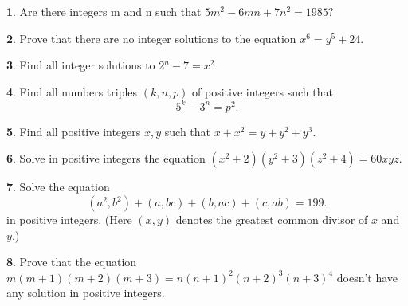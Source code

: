 \documentclass{article}
\theoremstyle{definition}
\newtheorem{p}{}
\begin{document}
	
	
	
	
	
	\begin{p}
		Are there integers m and n such that $5m^{2}-6mn+7n^{2}=1985$?
	\end{p}
	
	
	
	
	
	
	\begin{p}
		Prove that there are no integer solutions to the equation $x^{6}= y^{5}+24$.
	\end{p}
	
	
	
	
	
	
	\begin{p}
		Find all integer solutions to $2^n-7=x^2$
	\end{p}
	
	
	
	
	
	
	\begin{p}
		Find all numbers triples $(k,n,p)$ of positive integers such that
		\[5^{k}-3^{n}=p^{2}.\]
	\end{p}
	
	
	
	
	
	
	\begin{p}
		Find all positive integers $x,y$ such that $x+x^{2}=y+y^{2}+y^{3}$.
	\end{p}
	
	
	
	
	
	
	\begin{p}
		Solve in positive integers  the equation $(x^{2}+2)(y^{2}+3)(z^{2}+4)=60xyz$.
	\end{p}
	
	
	
	
	
	
	\begin{p}
		Solve the equation 
		\[(a^{2},b^{2})+(a,bc)+(b,ac)+(c,ab)=199.\]
		in positive integers. (Here $(x,y)$ denotes the greatest common divisor of $x$ and $y$.)
	\end{p}
	
	
	
	
	
	
	\begin{p}
		Prove that the equation $m(m+1)(m+2)(m+3)=n(n+1)^{2}(n+2)^{3}(n+3)^{4}$ doesn't have any solution in positive integers.
	\end{p}
	
	
	
\end{document}
